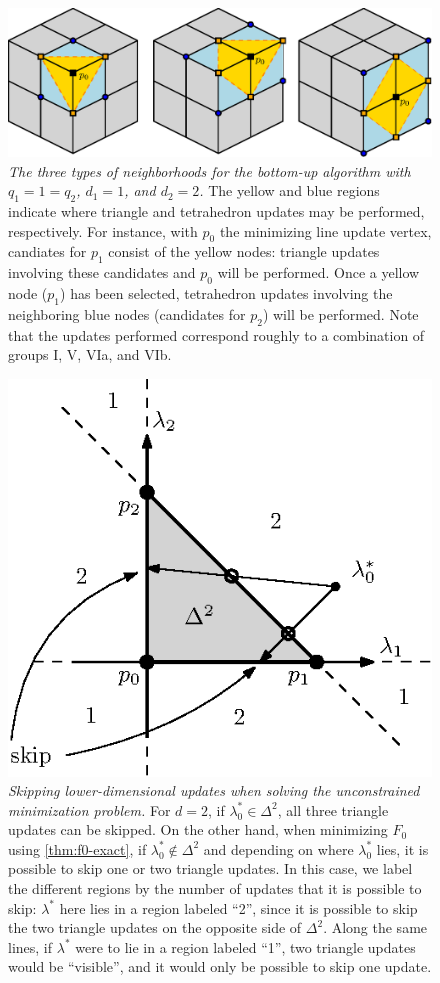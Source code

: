 \documentclass{article}
\begin{document}
\begin{figure}[t]
  \centering
  \includegraphics[width=0.85\linewidth]{hu-neighborhoods.eps}
  \caption{\emph{The three types of neighborhoods for the bottom-up
      algorithm with $q_1 = 1 = q_2$, $d_1 = 1$, and $d_2 = 2$.} The
    yellow and blue regions indicate where triangle and tetrahedron
    updates may be performed, respectively. For instance, with $p_0$
    the minimizing line update vertex, candiates for $p_1$ consist of
    the yellow nodes: triangle updates involving these candidates and
    $p_0$ will be performed. Once a yellow node ($p_1$) has been
    selected, tetrahedron updates involving the neighboring blue nodes
    (candidates for $p_2$) will be performed. Note that the updates
    performed correspond roughly to a combination of groups I, V, VIa,
    and VIb.}\label{fig:hu-neighborhoods}
\end{figure}


\begin{figure}
  \centering
  \includegraphics[width=0.4\linewidth]{skip-zones.eps}
  \caption{\emph{Skipping lower-dimensional updates when solving the
      unconstrained minimization problem.} For $d = 2$, if
    $\lambda_0^* \in \Delta^2$, all three triangle updates can be
    skipped. On the other hand, when minimizing $F_0$ using
    \cref{thm:f0-exact}, if $\lambda^*_0 \notin \Delta^2$ and
    depending on where $\lambda_0^*$ lies, it is possible to skip one
    or two triangle updates. In this case, we label the different
    regions by the number of updates that it is possible to skip:
    $\lambda^*$ here lies in a region labeled ``2'', since it is
    possible to skip the two triangle updates on the opposite side of
    $\Delta^2$. Along the same lines, if $\lambda^*$ were to lie in a
    region labeled ``1'', two triangle updates would be ``visible'',
    and it would only be possible to skip one
    update.}\label{fig:skip-zones}
\end{figure}
\end{document}
